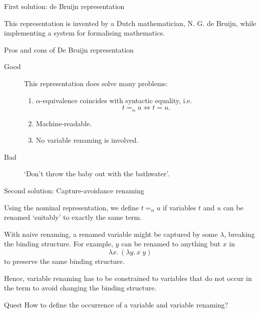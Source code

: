 \begin{frame}{First solution: de Bruijn representation}
\begin{center}
\begin{minipage}{.4\textwidth}
    \end{minipage}
  \end{center}
  This representation is invented by a Dutch mathematician, N. G. de Bruijn, while implementing a system for formalising mathematics.
\end{frame}

\begin{frame}{Pros and cons of De Bruijn representation}
   
  \begin{description}
    \item[Good] This representation does solve many problems:
      \begin{enumerate}
        \item $\alpha$-equivalence coincides with syntactic equality, i.e.
          \[
            t =_\alpha u \iff t = u.
          \]
        \item Machine-readable.
        \item No variable renaming is involved.
      \end{enumerate}
    \item[Bad] `Don't throw the baby out with the bathwater'.
  \end{description}
\end{frame}

\begin{frame}{Second solution: Capture-avoidance renaming}
  \begin{idea}
    Using the nominal representation, we define $t =_\alpha u$ if variables $t$ and $u$ can be renamed `suitably' to exactly the same term.
  \end{idea}
  With naive renaming, a renamed variable might be \alert{captured} by some $\lambda$, breaking the binding structure.
  For example, $y$ can be renamed to anything but $x$ in 
  \[
    \lambda x.\,(\lambda y.\, x \; y)
  \]
  to preserve the same binding structure.

  Hence, variable renaming has to be constrained to variables that do not \alert{occur} in the term to avoid changing the binding structure.
  \begin{alertblock}{Quest}
    How to define the \alert{occurrence} of a variable and variable \alert{renaming}?
  \end{alertblock}
\end{frame}

